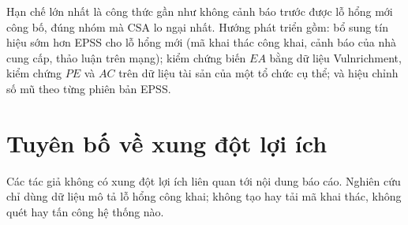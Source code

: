 \documentclass[conference]{IEEEtran}
\begin{document}
Hạn chế lớn nhất là công thức gần như không cảnh báo trước được lỗ hổng mới công bố, đúng nhóm mà
CSA lo ngại nhất. Hướng phát triển gồm: bổ sung tín hiệu sớm hơn EPSS cho lỗ hổng mới (mã khai thác
công khai, cảnh báo của nhà cung cấp, thảo luận trên mạng); kiểm chứng biến $\mathit{EA}$ bằng dữ liệu Vulnrichment, kiểm chứng $\mathit{PE}$ và $AC$ trên dữ liệu tài sản của một tổ chức cụ thể; và hiệu chỉnh số mũ theo từng phiên bản EPSS.

\section*{Tuyên bố về xung đột lợi ích}
Các tác giả không có xung đột lợi ích liên quan tới nội dung báo cáo. Nghiên cứu chỉ dùng dữ liệu mô
tả lỗ hổng công khai; không tạo hay tải mã khai thác, không quét hay tấn công hệ thống nào.
\end{document}
